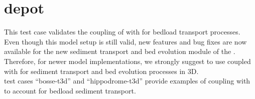 \chapter{depot}

This test case validates the coupling of  with \sisyphe
for bedload transport processes.\\

Even though this model setup is still valid, new features and bug fixes are now
available for the new sediment transport and bed evolution module \gaia of the
\telemacsystem.
Therefore, for newer model implementations, we strongly suggest to use
 coupled with \gaia for sediment transport and bed evolution
processes in 3D.\\

\gaia test cases “bosse-t3d” and “hippodrome-t3d” provide examples of coupling
 with \gaia to account for bedload sediment transport.
